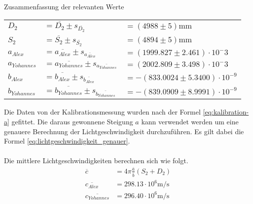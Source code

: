 \begin{center}
    \begin{threeparttable}
        \caption{Zusammenfassung der relevanten Werte}
        \label{tab:kalibration-werte}
        \begin{tabular}{llp{50mm}}
            \toprule
            $D_2$           & $= \overline{D_2} \pm s_{\overline{D_2}}$                     & $= (4988 \pm 5)\textrm{mm}$ \\
            $S_2$           & $= \overline{S_2} \pm s_{\overline{S_2}}$                     & $= (4894 \pm 5)\textrm{mm}$ \\
            $a_{Alex}$      & $= \overline{a_{Alex}} \pm s_{\overline{a_{Alex}}}$           & $= (1999.827 \pm 2.461) \cdot 10^-3$ \\
            $a_{Yohannes}$  & $= \overline{a_{Yohannes}} \pm s_{\overline{a_{Yohannes}}}$   & $= (2002.809 \pm 3.498) \cdot 10^-3$ \\
            $b_{Alex}$      & $= \overline{b_{Alex}} \pm s_{\overline{b_{Alex}}}$           & $= -(833.0024 \pm 5.3400) \cdot 10^{-9}$ \\
            $b_{Yohannes}$  & $= \overline{b_{Yohannes}} \pm s_{\overline{b_{Yohannes}}}$   & $= -(839.0909 \pm 8.9991) \cdot 10^{-9}$ \\
            \bottomrule
        \end{tabular}
    \end{threeparttable}
\end{center}

Die   Daten   von   der    Kalibrationsmessung    wurden    nach    der   Formel
\ref{eq:kalibration-a}  gefittet.   Die   daraus  gewonnene  Steigung  $a$  kann
verwendet   werden  um  eine  genauere   Berechnung   der   Lichtgeschwindigkeit
durchzuf\"uhren. Es gilt dabei die Formel \ref{eq:lichtgeschwindigkeit_genauer}.
\begin{align*}
\end{align*}

Die mittlere Lichtgeschwindigkeiten berechnen sich wie folgt.
\begin{align*}
    \overline{c}            &= 4\pi\frac{\overline{a}}{\overline{b}}(S_2 + D_2) \\
    \overline{c_{Alex}}     &= 298.13 \cdot 10^6 \textrm{m}/\textrm{s} \\
    \overline{c_{Yohannes}} &= 296.40 \cdot 10^6 \textrm{m}/\textrm{s} \\
\end{align*}

